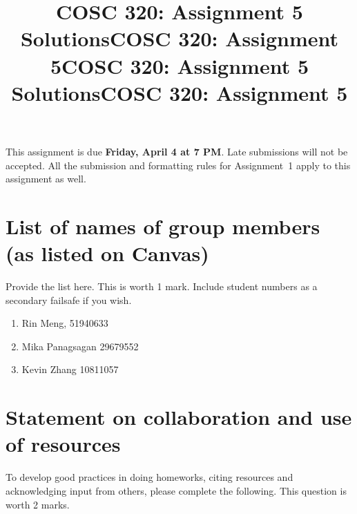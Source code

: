 \documentclass[11pt,fleqn]{exam}
\title{COSC 320: Assignment 5 Solutions}
\title{COSC 320: Assignment 5}
\author{}
\date{}
\title{COSC 320: Assignment 5 Solutions}
\title{COSC 320: Assignment 5}
\newif\ifsolutions\solutionsfalse
\begin{document}
	\maketitle

    \ifsolutions
\setcounter{section}{2}
\else
 This assignment is due \textbf{Friday, April 4 at 7 PM}. Late submissions will not be accepted. All the submission and formatting rules for Assignment~1 apply to this assignment as well.  

\section{List of names of group members (as listed on Canvas)}

Provide the list here. This is worth 1 mark. Include student numbers as a secondary failsafe if you wish.

\begin{enumerate}
      \item Rin Meng, 51940633
      \item Mika Panagsagan 29679552
      \item Kevin Zhang 10811057
\end{enumerate}

\section{Statement on collaboration and use of resources}
To develop good practices in doing homeworks, citing resources and acknowledging input from others, please complete the following. This question is worth 2 marks.
\end{document}
